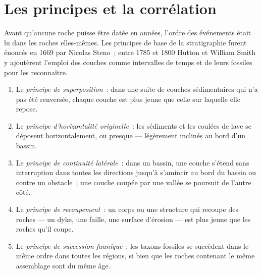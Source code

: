 \section{Les principes et la corrélation}\label{sec:b1:stratigraphic-scale:principles}

Avant qu'aucune roche puisse être datée en années, l'ordre des événements était lu dans les
roches elles-mêmes. Les principes de base de la stratigraphie furent énoncés en 1669 par
Nicolas Steno~; entre 1785 et 1800 Hutton et William Smith y ajoutèrent l'emploi
des couches comme intervalles de temps et de leurs fossiles pour les reconnaître.

\begin{definition}\label{def:b1:stratigraphic-scale:principles}
\begin{enumerate}
  \item Le \emph{principe de superposition}~: dans une suite de couches sédimentaires qui n'a pas été renversée,
        chaque couche est plus jeune que celle sur laquelle elle repose.
  \item Le \emph{principe d'horizontalité originelle}~: les sédiments et les coulées de lave se déposent
        horizontalement, ou presque --- légèrement inclinés au bord d'un
        bassin.
  \item Le \emph{principe de continuité latérale}~: dans un bassin, une couche s'étend sans interruption dans toutes les
        directions jusqu'à s'amincir au bord du bassin ou contre un
        obstacle~; une couche coupée par une vallée se poursuit de l'autre côté.
  \item Le \emph{principe de recoupement}~: un corps ou une structure qui recoupe des
        roches --- un dyke, une faille, une surface d'érosion --- est plus jeune que les
        roches qu'il coupe.
  \item Le \emph{principe de succession faunique}~: les taxons fossiles se succèdent dans le même ordre dans
        toutes les régions, si bien que les roches contenant le même assemblage sont du même
        âge.
\end{enumerate}
\end{definition}

